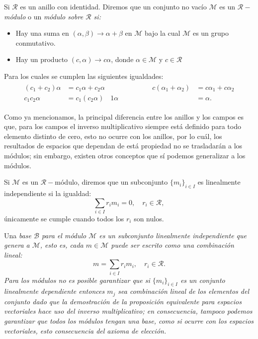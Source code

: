 \begin{definition}[Módulo]
	Si $\mathcal{R}$ es un anillo con identidad. Diremos que un conjunto no vacío $\mathcal{M}$ es un \textit{$\mathcal{R}-$módulo} o un \it{módulo sobre $\mathcal{R}$} si:
	\begin{itemize}
		\item Hay una suma en $(\alpha,\beta) \to \alpha + \beta$ en $\mathcal{M}$ bajo la cual $\mathcal{M}$ es un grupo conmutativo.
		\item Hay un producto $(c,\alpha) \to c \alpha$, donde $\alpha \in \mathcal{M}$ y $c \in \mathcal{R}$
	\end{itemize}
	Para los cuales se cumplen las siguientes igualdades:
	\begin{gather*}
		\begin{alignedat}{2}
			(c_1 + c_2) \alpha                    & = c_1 \alpha + c_2 \alpha
			& \hspace{6em} c(\alpha_1 + \alpha_2) & = c\alpha_1 + c\alpha_2 \\
			c_1 c_2 \alpha                        & = c_1(c_2 \alpha)
			& 1 \alpha                            & = \alpha.
		\end{alignedat}
	\end{gather*}
\end{definition}
Como ya mencionamos, la principal diferencia entre los anillos y los campos es que, para los campos el inverso multiplicativo siempre está definido para todo elemento distinto de cero, esto no ocurre con los anillos, por lo cuál, los resultados de espacios que dependan de está propiedad no se trasladarán a los módulos; sin embargo, existen otros conceptos que sí podemos generalizar a los módulos.

\begin{definition}
	Si $\mathcal{M}$ es un $\mathcal{R}-$módulo, diremos que un subconjunto $\{m_i\}_{i \in I}$ es linealmente independiente si la igualdad:
	\[
		\sum_{i \in I} r_i m_i = 0, \quad r_i \in \mathcal{R},
	\]
	únicamente se cumple cuando todos los $r_i$ son nulos.

	Una \it{base} $\mathcal{B}$ para el módulo $\mathcal{M}$ es un subconjunto linealmente independiente que genera a $\mathcal{M}$, esto es, cada $m \in \mathcal{M}$ puede ser escrito como una combinación lineal:
	\[m = \sum_{i \in I} r_i m_i, \quad r_i \in \mathcal{R}.\]
	Para los módulos no es posible garantizar que si $\{m_i\}_{i \in I}$ es un conjunto linealmente dependiente entonces $m_j$ sea combinación lineal de los elementos del conjunto dado que la demostración de la proposición equivalente para espacios vectoriales hace uso del inverso multiplicativo; en consecuencia, tampoco podemos garantizar que todos los módulos tengan una base, como si ocurre con los espacios vectoriales, esto consecuencia del axioma de elección.
\end{definition}

